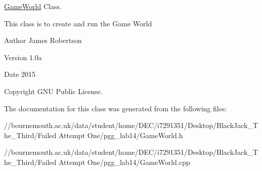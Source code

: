 \hyperlink{class_game_world}{Game\+World} Class. 

This class is to create and run the Game World \begin{DoxyAuthor}{Author}
James Robertson 
\end{DoxyAuthor}
\begin{DoxyVersion}{Version}
1.\+0a 
\end{DoxyVersion}
\begin{DoxyDate}{Date}
2015 
\end{DoxyDate}
\begin{DoxyCopyright}{Copyright}
G\+N\+U Public License. 
\end{DoxyCopyright}


The documentation for this class was generated from the following files\+:\begin{DoxyCompactItemize}
\item 
//bournemouth.\+ac.\+uk/data/student/home/\+D\+E\+C/i7291351/\+Desktop/\+Black\+Jack\+\_\+\+The\+\_\+\+Third/\+Failed Attempt One/pgg\+\_\+lab14/Game\+World.\+h\item 
//bournemouth.\+ac.\+uk/data/student/home/\+D\+E\+C/i7291351/\+Desktop/\+Black\+Jack\+\_\+\+The\+\_\+\+Third/\+Failed Attempt One/pgg\+\_\+lab14/Game\+World.\+cpp\end{DoxyCompactItemize}

